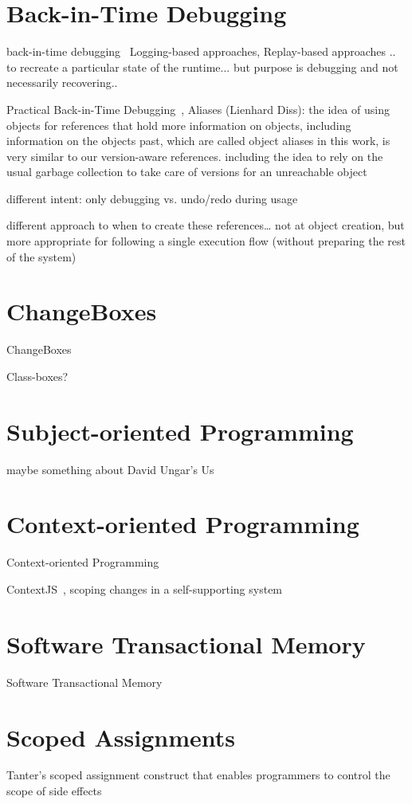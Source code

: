 \section{Back-in-Time Debugging}

back-in-time debugging~\cite{Lewis2003BIT}
Logging-based approaches, Replay-based approaches .. to recreate a particular state of the runtime... but purpose is debugging and not necessarily recovering.. 

Practical Back-in-Time Debugging~\cite{Lienhard2008POB}, Aliases (Lienhard Diss): the idea of using objects for references that hold more information on objects, including information on the objects past, which are called object aliases in this work, is very similar to our version-aware references. including the idea to rely on the usual garbage collection to take care of versions for an unreachable object

different intent: only debugging vs. undo/redo during usage

different approach to when to create these references… not at object creation, but more appropriate for following a single execution flow (without preparing the rest of the system)



\section{ChangeBoxes}
ChangeBoxes~\cite{Denker2007EEC}

Class-boxes? 



\section{Subject-oriented Programming}
maybe something about David Ungar's Us~\cite{}



\section{Context-oriented Programming}
Context-oriented Programming~\cite{Hirschfeld2008COP}

ContextJS~\cite{Lincke2011OIC}, scoping changes in a self-supporting system~\cite{Lincke2012SCS}


\section{Software Transactional Memory}
Software Transactional Memory~\cite{Shavit1995STM}



\section{Scoped Assignments}
Tanter's scoped assignment construct  that enables programmers to control the scope of side effects 



